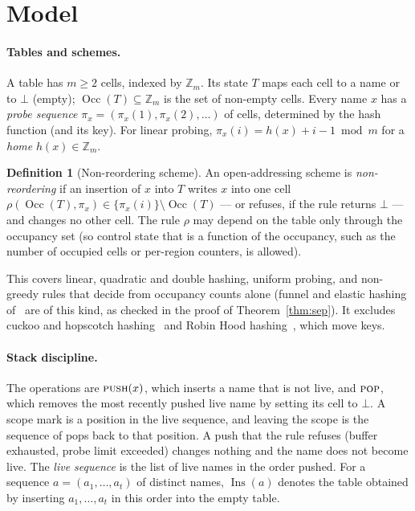 \documentclass[11pt,a4paper]{article}
\theoremstyle{definition}
\newtheorem{definition}[theorem]{Definition}
\theoremstyle{remark}
\newcommand{\Z}{\mathbb{Z}}
\DeclareMathOperator{\Ins}{Ins}
\DeclareMathOperator{\Occ}{Occ}
\begin{document}
\section{Model}\label{sec:model}

\paragraph{Tables and schemes.} A table has $m\ge 2$ cells, indexed by $\Z_m$. Its state $T$ maps each cell to a name or to $\bot$ (empty); $\Occ(T)\subseteq\Z_m$ is the set of non-empty cells. Every name $x$ has a \emph{probe sequence} $\pi_x=(\pi_x(1),\pi_x(2),\dots)$ of cells, determined by the hash function (and its key). For linear probing, $\pi_x(i)=h(x)+i-1 \bmod m$ for a \emph{home} $h(x)\in\Z_m$.

\begin{definition}[Non-reordering scheme]\label{def:scheme}
An open-addressing scheme is \emph{non-reordering} if an insertion of $x$ into $T$ writes $x$ into one cell $\rho(\Occ(T),\pi_x)\in\{\pi_x(i)\}\setminus\Occ(T)$ --- or refuses, if the rule returns $\bot$ --- and changes no other cell. The rule $\rho$ may depend on the table only through the occupancy set (so control state that is a function of the occupancy, such as the number of occupied cells or per-region counters, is allowed).
\end{definition}

This covers linear, quadratic and double hashing, uniform probing, and non-greedy rules that decide from occupancy counts alone (funnel and elastic hashing of~\cite{fkk2024} are of this kind, as checked in the proof of Theorem~\ref{thm:sep}). It excludes cuckoo and hopscotch hashing~\cite{pagh2004,herlihy2008} and Robin Hood hashing~\cite{celis1985}, which move keys.

\paragraph{Stack discipline.} The operations are $\textsc{push}(x)$, which inserts a name that is not live, and $\textsc{pop}$, which removes the most recently pushed live name by setting its cell to $\bot$. A scope mark is a position in the live sequence, and leaving the scope is the sequence of pops back to that position. A push that the rule refuses (buffer exhausted, probe limit exceeded) changes nothing and the name does not become live. The \emph{live sequence} is the list of live names in the order pushed. For a sequence $a=(a_1,\dots,a_t)$ of distinct names, $\Ins(a)$ denotes the table obtained by inserting $a_1,\dots,a_t$ in this order into the empty table.
\end{document}
